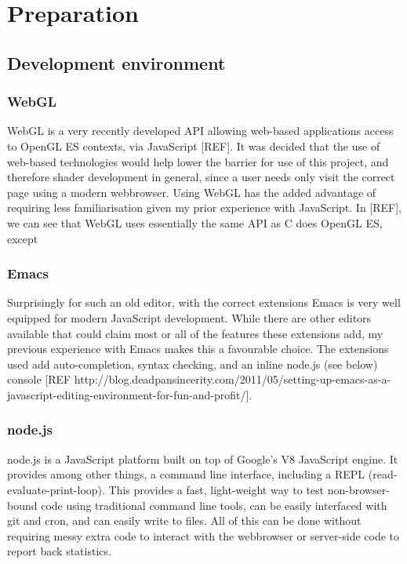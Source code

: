 \documentclass[12pt,twoside,notitlepage]{report}
\begin{document}
\chapter{Preparation}

\section{Development environment}
\subsection*{WebGL}
WebGL is a very recently developed API allowing web-based applications access to OpenGL ES contexts, via JavaScript [REF]. It was decided that the use of web-based technologies would help lower the barrier for use of this project, and therefore shader development in general, since a user needs only visit the correct page using a modern webbrowser. Using WebGL has the added advantage of requiring less familiarisation given my prior experience with JavaScript. In [REF], we can see that WebGL uses essentially the same API as C does OpenGL ES, except 



\subsection*{Emacs}
Surprisingly for such an old editor, with the correct extensions Emacs is very well equipped for modern JavaScript development. While there are other editors available that could claim most or all of the features these extensions add, my previous experience with Emacs makes this a favourable choice. The extensions used add auto-completion, syntax checking, and an inline node.js (see below) console [REF http://blog.deadpansincerity.com/2011/05/setting-up-emacs-as-a-javascript-editing-environment-for-fun-and-profit/].

\subsection*{node.js}
node.js is a JavaScript platform built on top of Google's V8 JavaScript engine. It provides among other things, a command line interface, including a REPL (read-evaluate-print-loop). This provides a fast, light-weight way to test non-browser-bound code using traditional command line tools, can be easily interfaced with git and cron, and can easily write to files. All of this can be done without requiring messy extra code to interact with the webbrowser or server-side code to report back statistics.
\end{document}
